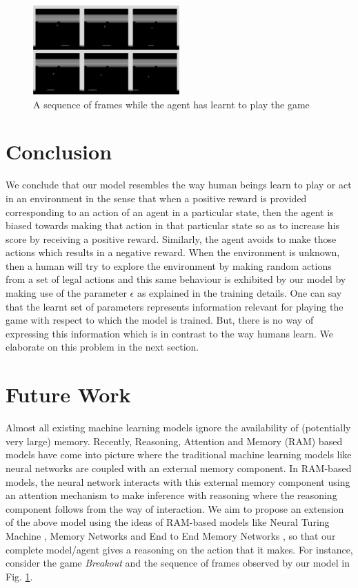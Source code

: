 \documentclass[conference]{IEEEtran}
\begin{document}
\begin{figure}[h]
\includegraphics[width=0.5\textwidth]{sequenceLearnt}
\caption[width=\textwidth]{A sequence of frames while the agent has learnt to play the game}
\label{fig:sequenceLearnt}
\end{figure}

\section{Conclusion}
We conclude that our model resembles the way human beings learn to play or act in an environment in the sense that when a positive reward is provided corresponding to an action of an agent in a particular state, then the agent is biased towards making that action in that particular state so as to increase his score by receiving a positive reward. Similarly, the agent avoids to make those actions which results in a negative reward. When the environment is unknown, then a human will try to explore the environment by making random actions from a set of legal actions and this same behaviour is exhibited by our model by making use of the parameter $\epsilon$ as explained in the training details. One can say that the learnt set of parameters represents information relevant for playing the game with respect to which the model is trained. But, there is no way of expressing this information which is in contrast to the way humans learn. We elaborate on this problem in the next section.

\section{Future Work}
Almost all existing machine learning models ignore the availability of (potentially very large) memory. Recently, Reasoning, Attention and Memory (RAM) based models have come into picture where the traditional machine learning models like neural networks are coupled with an external memory component. In RAM-based models, the neural network interacts with this external memory component using an attention mechanism to make inference with reasoning where the reasoning component follows from the way of interaction. We aim to propose an extension of the above model using the ideas of RAM-based models like Neural Turing Machine \cite{ntm} \cite{ntmrl}, Memory Networks \cite{memnn} and End to End Memory Networks \cite{e2ememnn}, so that our complete model/agent gives a reasoning on the action that it makes. For instance, consider the game \textit{Breakout} and the sequence of frames observed by our model in Fig. \ref{fig:sequenceLearnt}.
\end{document}
